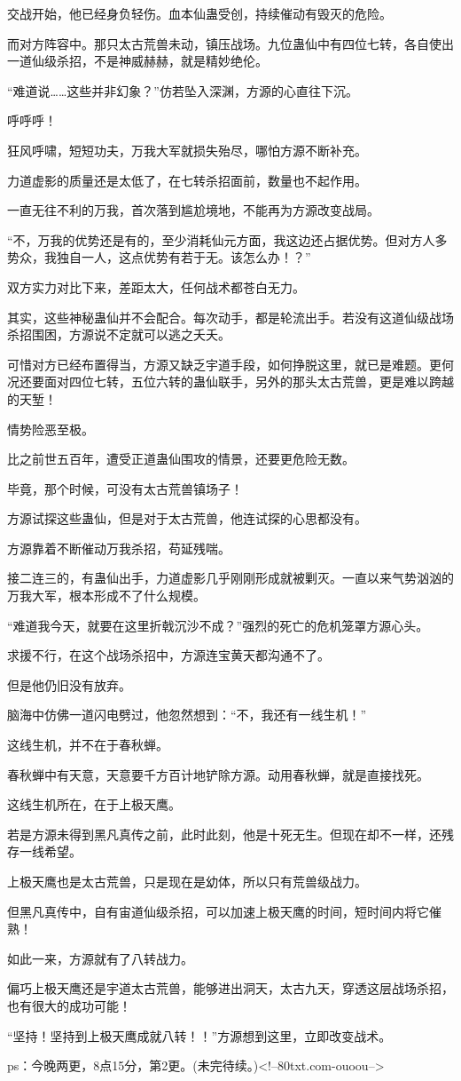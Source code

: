 \begin{this_body}
交战开始，他已经身负轻伤。血本仙蛊受创，持续催动有毁灭的危险。

而对方阵容中。那只太古荒兽未动，镇压战场。九位蛊仙中有四位七转，各自使出一道仙级杀招，不是神威赫赫，就是精妙绝伦。

“难道说……这些并非幻象？”仿若坠入深渊，方源的心直往下沉。

呼呼呼！

狂风呼啸，短短功夫，万我大军就损失殆尽，哪怕方源不断补充。

力道虚影的质量还是太低了，在七转杀招面前，数量也不起作用。

一直无往不利的万我，首次落到尴尬境地，不能再为方源改变战局。

“不，万我的优势还是有的，至少消耗仙元方面，我这边还占据优势。但对方人多势众，我独自一人，这点优势有若于无。该怎么办！？”

双方实力对比下来，差距太大，任何战术都苍白无力。

其实，这些神秘蛊仙并不会配合。每次动手，都是轮流出手。若没有这道仙级战场杀招围困，方源说不定就可以逃之夭夭。

可惜对方已经布置得当，方源又缺乏宇道手段，如何挣脱这里，就已是难题。更何况还要面对四位七转，五位六转的蛊仙联手，另外的那头太古荒兽，更是难以跨越的天堑！

情势险恶至极。

比之前世五百年，遭受正道蛊仙围攻的情景，还要更危险无数。

毕竟，那个时候，可没有太古荒兽镇场子！

方源试探这些蛊仙，但是对于太古荒兽，他连试探的心思都没有。

方源靠着不断催动万我杀招，苟延残喘。

接二连三的，有蛊仙出手，力道虚影几乎刚刚形成就被剿灭。一直以来气势汹汹的万我大军，根本形成不了什么规模。

“难道我今天，就要在这里折戟沉沙不成？”强烈的死亡的危机笼罩方源心头。

求援不行，在这个战场杀招中，方源连宝黄天都沟通不了。

但是他仍旧没有放弃。

脑海中仿佛一道闪电劈过，他忽然想到：“不，我还有一线生机！”

这线生机，并不在于春秋蝉。

春秋蝉中有天意，天意要千方百计地铲除方源。动用春秋蝉，就是直接找死。

这线生机所在，在于上极天鹰。

若是方源未得到黑凡真传之前，此时此刻，他是十死无生。但现在却不一样，还残存一线希望。

上极天鹰也是太古荒兽，只是现在是幼体，所以只有荒兽级战力。

但黑凡真传中，自有宙道仙级杀招，可以加速上极天鹰的时间，短时间内将它催熟！

如此一来，方源就有了八转战力。

偏巧上极天鹰还是宇道太古荒兽，能够进出洞天，太古九天，穿透这层战场杀招，也有很大的成功可能！

“坚持！坚持到上极天鹰成就八转！！”方源想到这里，立即改变战术。

ps：今晚两更，8点15分，第2更。(未完待续。)<!--80txt.com-ouoou-->

\end{this_body}

